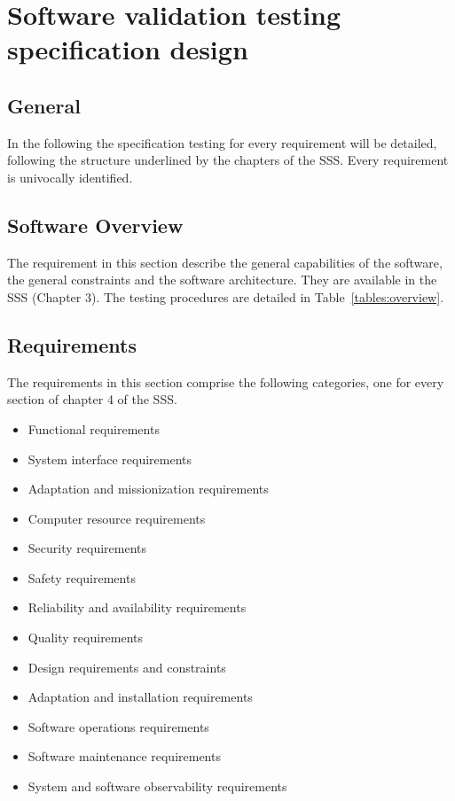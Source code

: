 \chapter{Software validation testing specification design}

\section{General}

In the following the specification testing for every requirement will be detailed, following the structure underlined by the chapters of the SSS.
Every requirement is univocally identified.

\section{Software Overview}
The requirement in this section describe the general capabilities of the software, the general constraints and the software architecture.
They are available in the SSS (Chapter 3).
The testing procedures are detailed in Table~\ref{tables:overview}.



\section{Requirements}

The requirements in this section comprise the following categories, one for every section of chapter 4 of the SSS.

\begin{itemize}
  \item Functional requirements
  \item System interface requirements
  \item Adaptation and missionization requirements
  \item Computer resource requirements
  \item Security requirements
  \item Safety requirements
  \item Reliability and availability requirements
  \item Quality requirements
  \item Design requirements and constraints
  \item Adaptation and installation requirements
  \item Software operations requirements
  \item Software maintenance requirements
  \item System and software observability requirements
\end{itemize}

